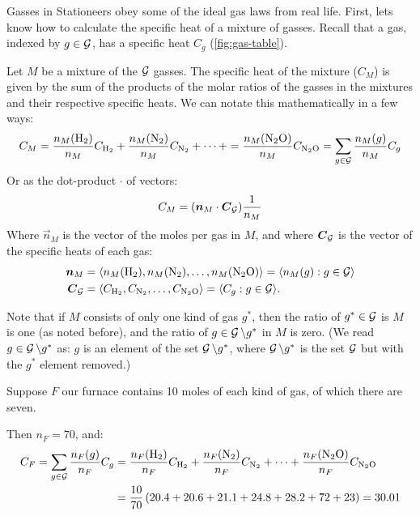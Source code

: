 \documentclass{article}
\DeclareMathOperator{\Hyd}{\mathrm{H}_2}
\DeclareMathOperator{\Nit}{\mathrm{N}_2}
\DeclareMathOperator{\NiOx}{\mathrm{N}_2\mathrm{O}}
\begin{document}
Gasses in Stationeers obey some of the ideal gas laws from real life.
First, lets know how to calculate the specific heat of a mixture of gasses.
Recall that a gas, indexed by $g\in\operatorname{{\mathcal{G}}}$, has a specific heat $C_g$ (\autoref{fig:gas-table}).
\begin{definition}
    Let $M$ be a mixture of the $\operatorname{{\mathcal{G}}}$ gasses. The specific heat of the mixture ($C_M$) is given by
    the sum of the products of the molar ratios of the gasses in the mixtures and their respective
    specific heats. We can notate this mathematically in a few ways:
    \[
        C_M
        = \frac{n_M(\Hyd)}{n_M}C_{\Hyd}
        + \frac{n_M(\Nit)}{n_M}C_{\Nit}
        + \cdots
        + = \frac{n_M(\NiOx)}{n_M}C_{\NiOx}
        = \sum_{g\in\calG} \frac{n_M(g)}{n_M}C_g
    \]
    Or as the dot-product $\cdot$ of vectors:
    \begin{equation}
        C_M = (\boldsymbol{n}_M \cdot \boldsymbol{C}_{\operatorname{{\mathcal{G}}}})\frac{1}{n_M}
    \end{equation}
    Where $\vec{n}_M$ is the vector of the moles per gas in $M$, and
    where $\boldsymbol{C}_{\operatorname{{\mathcal{G}}}}$ is the vector of the specific heats of each gas:
    \begin{align*}
        \vec{n}_M
        &= \angvec{n_M(\Hyd),n_M(\Nit),\ldots,n_M(\NiOx)}
        = \angvec{n_M(g):g\in\calG} \\
        \vec{C}_{\calG}
        &= \angvec{C_{\Hyd},C_{\Nit},\ldots,C_{\NiOx}}
        = \angvec{C_g:g\in\calG}.
    \end{align*}
\end{definition}
Note that if $M$ consists of only one kind of gas $g^*$, then the ratio of $g^*\in\operatorname{{\mathcal{G}}}$ is $M$ is one
(as noted before), and the ratio of $g\in\operatorname{{\mathcal{G}}}\setminus g^*$ in $M$ is zero.
(We read $g\in \operatorname{{\mathcal{G}}}\setminus g^*$ as: $g$ is an element of the set $\operatorname{{\mathcal{G}}}\setminus g^*$,
where $\operatorname{{\mathcal{G}}}\setminus g^*$ is the set $\operatorname{{\mathcal{G}}}$ but with the $g^*$ element removed.)
\begin{example}
    Suppose $F$ our furnace contains 10 moles of each kind of gas, of which there are seven.

    Then $n_F=70$, and:
    \begin{align*}
        C_F
        = \sum_{g\in\calG}\frac{n_F(g)}{n_F}C_g
        &= \frac{n_F(\Hyd)}{n_F}C_{\Hyd}+\frac{n_F(\Nit)}{n_F}C_{\Nit}+\cdots+\frac{n_F(\NiOx)}{n_F}C_{\NiOx} \\
        &= \frac{10}{70}\left(20.4 + 20.6 + 21.1 + 24.8 + 28.2 + 72 + 23\right)
        = 30.01
    \end{align*}
\end{example}
\end{document}
